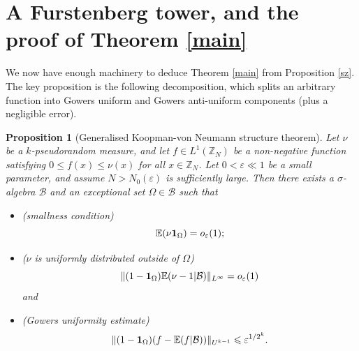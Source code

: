 \documentclass[12pt,a4paper,reqno]{amsart}
\numberwithin{equation}{section}
\theoremstyle{plain}
\newtheorem{proposition}[subsection]{Proposition}
\theoremstyle{definition}
\renewcommand{\leq}{\leqslant}
\def\B{{\mathcal B}}
\def\Z{{\mathbb Z}}
\def\E{{\mathbb E}}
\def\eps{{\varepsilon}}
\def\ni{\noindent}
\begin{document}
\section{A Furstenberg tower, and the proof of Theorem \ref{main}}\label{sec7}

\ni We now have enough machinery to deduce Theorem \ref{main} from Proposition \ref{sz}.  The key proposition is the following decomposition, which splits an arbitrary function into Gowers uniform and Gowers anti-uniform components (plus a negligible error).

\begin{proposition}[Generalised Koopman-von Neumann structure theorem]\label{kvn-decomp}  Let $\nu$ be a $k$-pseudorandom measure,
and let $f \in L^1(\Z_N)$ be a non-negative function satisfying $0 \leq f(x) \leq \nu(x)$ for all $x \in \Z_N$. Let $0 < \eps \ll 1$ be a small parameter, and assume $N > N_0(\eps)$ is sufficiently large.
Then there exists a $\sigma$-algebra $\B$ and an exceptional set $\Omega \in \B$ such that
\begin{itemize}
\item \textup{(}smallness condition\textup{)} 
\begin{equation}\label{small-exceptions-final}
 \E( \nu {\bf 1}_{\Omega} ) = o_\eps(1);
\end{equation}
\item \textup{(}$\nu$ is uniformly distributed outside of $\Omega$\textup{)}
\begin{equation}\label{mu-regular-final}
 \| (1 - {\bf 1}_{\Omega}) \E( \nu - 1 | \B) \|_{L^\infty} = o_{\eps}(1)
\end{equation} and
\item \textup{(}Gowers uniformity estimate\textup{)}
\begin{equation}\label{unif-ok}
 \| (1 - {\bf 1}_{\Omega}) (f - \E(f|\B)) \|_{U^{k-1}} \leq \eps^{1/2^k}.
\end{equation}
\end{itemize}
\end{proposition}
\end{document}
